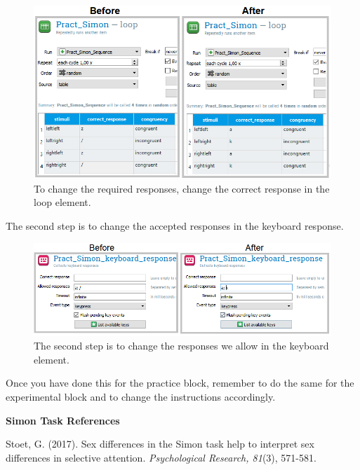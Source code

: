 \documentclass[
]{book}
\begin{document}
\begin{figure}

{\centering \includegraphics[width=0.99\linewidth]{images/changesimon/09response1} 

}

\caption{To change the required responses, change the correct response in the loop element.}\label{fig:Figure2-15}
\end{figure}

The second step is to change the accepted responses in the keyboard response.

\begin{figure}

{\centering \includegraphics[width=0.99\linewidth]{images/changesimon/10response2} 

}

\caption{The second step is to change the responses we allow in the keyboard element.}\label{fig:Figure2-16}
\end{figure}

Once you have done this for the practice block, remember to do the same for the experimental block and to change the instructions accordingly.

\textbf{Simon Task References}

Stoet, G. (2017). Sex differences in the Simon task help to interpret sex differences in selective attention. \emph{Psychological Research, 81}(3), 571-581.
\end{document}
